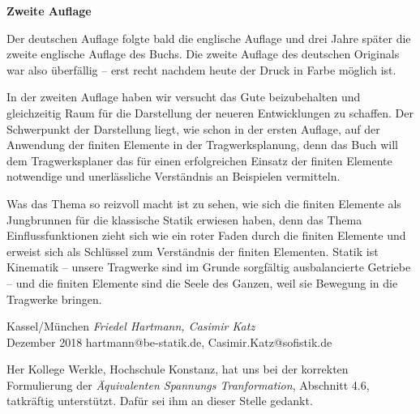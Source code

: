
\begin{flushleft}\large{\bf{Zweite Auflage}} \end{flushleft}

Der deutschen Auflage folgte bald die englische Auflage und drei Jahre sp\"{a}ter die zweite englische Auflage des Buchs. Die zweite Auflage des deutschen Originals war also \"{u}berf\"{a}llig -- erst recht nachdem heute der Druck in Farbe m\"{o}glich ist.

In der zweiten Auflage haben wir versucht das Gute beizubehalten und gleichzeitig Raum f\"{u}r die Darstellung der neueren Entwicklungen zu schaffen. Der Schwerpunkt der Darstellung liegt, wie schon in der ersten Auflage, auf der Anwendung der finiten Elemente in der Tragwerksplanung, denn das Buch will dem Tragwerksplaner das f\"{u}r einen erfolgreichen Einsatz der finiten Elemente notwendige und unerl\"{a}ssliche Verst\"{a}ndnis an Beispielen vermitteln.

Was das Thema so reizvoll macht ist zu sehen, wie sich die finiten Elemente als Jungbrunnen f\"{u}r die klassische Statik erwiesen haben, denn das Thema Einflussfunktionen zieht sich wie ein roter Faden durch die finiten Elemente und erweist sich als Schl\"{u}ssel zum Verst\"{a}ndnis der finiten Elementen. Statik ist Kinematik -- unsere Tragwerke sind im Grunde sorgf\"{a}ltig ausbalancierte Getriebe -- und die finiten Elemente sind die Seele des Ganzen, weil sie Bewegung in die Tragwerke bringen.

\begin{flushright}\noindent
Kassel/M\"{u}nchen  {\hfill {\it Friedel Hartmann, Casimir Katz}}\\\vspace{0.1cm}
Dezember 2018   {\hfill {hartmann@be-statik.de, Casimir.Katz@sofistik.de}}\\
\end{flushright}



\begin{acknowledgement}
Her Kollege Werkle, Hochschule Konstanz, hat uns bei der korrekten Formulierung der {\em \"{A}quivalenten Spannungs Tranformation\/}, Abschnitt 4.6, tatkr\"{a}ftig unterst\"{u}tzt. Daf\"{u}r sei ihm an dieser Stelle gedankt.\\
\end{acknowledgement}


